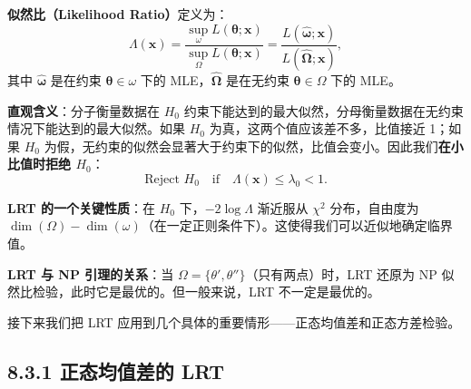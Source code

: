 \begin{definition}[似然比]\label{def:likelihood-ratio}
\textbf{似然比（Likelihood Ratio）}定义为：
\[
\Lambda(\mathbf{x}) = \frac{\sup_{\omega} L(\boldsymbol{\theta}; \mathbf{x})}{\sup_{\Omega} L(\boldsymbol{\theta}; \mathbf{x})} = \frac{L(\hat{\boldsymbol{\omega}}; \mathbf{x})}{L(\hat{\boldsymbol{\Omega}}; \mathbf{x})},
\]
其中 $\hat{\boldsymbol{\omega}}$ 是在约束 $\boldsymbol{\theta} \in \omega$ 下的 MLE，$\hat{\boldsymbol{\Omega}}$ 是在无约束 $\boldsymbol{\theta} \in \Omega$ 下的 MLE。
\end{definition}

\textbf{直观含义}：分子衡量数据在 $H_0$ 约束下能达到的最大似然，分母衡量数据在无约束情况下能达到的最大似然。如果 $H_0$ 为真，这两个值应该差不多，比值接近 1；如果 $H_0$ 为假，无约束的似然会显著大于约束下的似然，比值会变小。因此我们\textbf{在小比值时拒绝 $H_0$}：
\[
\text{Reject } H_0 \quad \text{if} \quad \Lambda(\mathbf{x}) \leq \lambda_0 < 1.
\]

\textbf{LRT 的一个关键性质}：在 $H_0$ 下，$-2\log\Lambda$ 渐近服从 $\chi^2$ 分布，自由度为 $\dim(\Omega) - \dim(\omega)$（在一定正则条件下）。这使得我们可以近似地确定临界值。

\textbf{LRT 与 NP 引理的关系}：当 $\Omega = \{\theta', \theta''\}$（只有两点）时，LRT 还原为 NP 似然比检验，此时它是最优的。但一般来说，LRT 不一定是最优的。

接下来我们把 LRT 应用到几个具体的重要情形——正态均值差和正态方差检验。

\subsection{8.3.1 正态均值差的 LRT}\label{sec:8.3.1}

